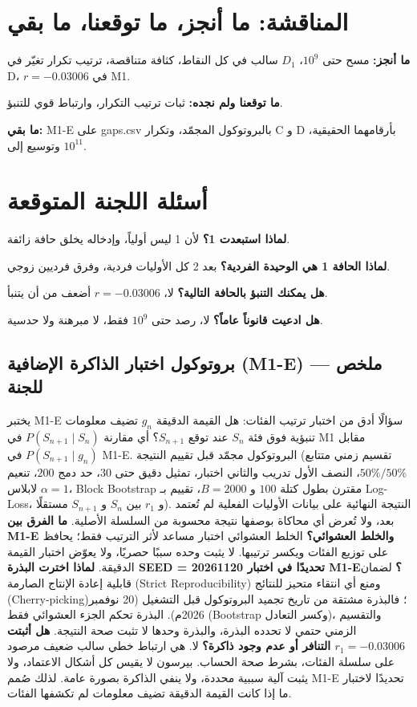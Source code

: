 \documentclass[12pt,a4paper]{article}
\begin{document}
\section{المناقشة: ما أنجز، ما توقعنا، ما بقي}
\textbf{ما أنجز:} مسح حتى $10^9$، $D_1$ سالب في كل النقاط، كثافة متناقصة، ترتيب تكرار تغيّر في D، $r=-0.03006$ في M1.

\textbf{ما توقعنا ولم نجده:} ثبات ترتيب التكرار، وارتباط قوي للتنبؤ.

\textbf{ما بقي:} M1-E على \textenglish{gaps.csv} بالبروتوكول المجمّد، وتكرار C و D بأرقامهما الحقيقية، وتوسيع إلى $10^{11}$.

\section{أسئلة اللجنة المتوقعة}
\textbf{لماذا استبعدت 1؟} لأن 1 ليس أولياً، وإدخاله يخلق حافة زائفة.

\textbf{لماذا الحافة 1 هي الوحيدة الفردية؟} بعد 2 كل الأوليات فردية، وفرق فرديين زوجي.

\textbf{هل يمكنك التنبؤ بالحافة التالية؟} لا، $r=-0.03006$ أضعف من أن يتنبأ.

\textbf{هل ادعيت قانوناً عاماً؟} لا، رصد حتى $10^9$ فقط، لا مبرهنة ولا حدسية.

\subsection*{بروتوكول اختبار الذاكرة الإضافية (\textenglish{M1-E}) — ملخص للجنة}
يختبر \textenglish{M1-E} سؤالًا أدق من اختبار ترتيب الفئات: هل القيمة الدقيقة $g_n$ تضيف معلومات تنبؤية فوق فئة $S_n$ عند توقع $S_{n+1}$؟ أي مقارنة $P(S_{n+1}\mid S_n)$ في \textenglish{M1} مقابل $P(S_{n+1}\mid g_n)$ في \textenglish{M1-E}. البروتوكول مجمّد قبل تقييم النتيجة (تقسيم زمني متتابع $50\%/50\%$، النصف الأول تدريب والثاني اختبار، تمثيل دقيق حتى $30$، حد دمج $200$، تنعيم لابلاس $\alpha=1$، \textenglish{Block Bootstrap} مقترن بطول كتلة $100$ و $B=2000$، تقييم بـ \textenglish{Log-Loss}، و $r_1$ بين $S_n$ و $S_{n+1}$ مستقلًا). النتيجة النهائية على بيانات الأوليات الفعلية لم تُعتمد بعد، ولا تُعرض أي محاكاة بوصفها نتيجة محسوبة من السلسلة الأصلية.
\textbf{ما الفرق بين \textenglish{M1-E} والخلط العشوائي؟} الخلط العشوائي اختبار مساعد لأثر الترتيب فقط؛ يحافظ على توزيع الفئات ويكسر ترتيبها. لا يثبت وحده سببًا حصريًا، ولا يعوّض اختبار القيمة الدقيقة.
\textbf{لماذا اخترت البذرة \textenglish{SEED = 20261120} تحديدًا في اختبار \textenglish{M1-E}؟} لضمان قابلية إعادة الإنتاج الصارمة (\textenglish{Strict Reproducibility}) ومنع أي انتقاء متحيز للنتائج (\textenglish{Cherry-picking})؛ فالبذرة مشتقة من تاريخ تجميد البروتوكول قبل التشغيل (20 نوفمبر 2026م). البذرة تحكم الجزء العشوائي فقط (Bootstrap وكسر التعادل)، والتقسيم الزمني حتمي لا تحدده البذرة، والبذرة وحدها لا تثبت صحة النتيجة.
\textbf{هل أثبتت $r_1=-0.03006$ التنافر أو عدم وجود ذاكرة؟} لا. هي ارتباط خطي سالب ضعيف مرصود على سلسلة الفئات، بشرط صحة الحساب. بيرسون لا يقيس كل أشكال الاعتماد، ولا يثبت آلية سببية محددة، ولا ينفي الذاكرة بصورة عامة. لذلك صُمم \textenglish{M1-E} تحديدًا لاختبار ما إذا كانت القيمة الدقيقة تضيف معلومات لم تكشفها الفئات.
\end{document}
